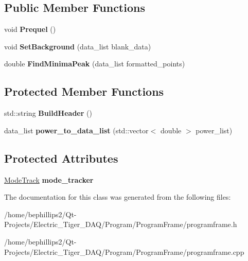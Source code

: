 \subsection*{Public Member Functions}
\begin{DoxyCompactItemize}
\item 
void {\bfseries Prequel} ()\hypertarget{class_program_frame_ad414371825d10a527fce320dfa54496d}{}\label{class_program_frame_ad414371825d10a527fce320dfa54496d}

\item 
void {\bfseries Set\+Background} (data\+\_\+list blank\+\_\+data)\hypertarget{class_program_frame_ad55dd180e9e02fed30d845acf7fab172}{}\label{class_program_frame_ad55dd180e9e02fed30d845acf7fab172}

\item 
double {\bfseries Find\+Minima\+Peak} (data\+\_\+list formatted\+\_\+points)\hypertarget{class_program_frame_afb7bcef124f7322ddbbdb92f019e2fce}{}\label{class_program_frame_afb7bcef124f7322ddbbdb92f019e2fce}

\end{DoxyCompactItemize}
\subsection*{Protected Member Functions}
\begin{DoxyCompactItemize}
\item 
std\+::string {\bfseries Build\+Header} ()\hypertarget{class_program_frame_adf569dd423bc777236db96cb781fd15b}{}\label{class_program_frame_adf569dd423bc777236db96cb781fd15b}

\item 
data\+\_\+list {\bfseries power\+\_\+to\+\_\+data\+\_\+list} (std\+::vector$<$ double $>$ power\+\_\+list)\hypertarget{class_program_frame_aee5a4d7ddc9308718d58d285fbce5acf}{}\label{class_program_frame_aee5a4d7ddc9308718d58d285fbce5acf}

\end{DoxyCompactItemize}
\subsection*{Protected Attributes}
\begin{DoxyCompactItemize}
\item 
\hyperlink{class_mode_track}{Mode\+Track} {\bfseries mode\+\_\+tracker}\hypertarget{class_program_frame_a20dca16ac55a07c4c1e1f47cae386740}{}\label{class_program_frame_a20dca16ac55a07c4c1e1f47cae386740}

\end{DoxyCompactItemize}


The documentation for this class was generated from the following files\+:\begin{DoxyCompactItemize}
\item 
/home/bephillips2/\+Qt-\/\+Projects/\+Electric\+\_\+\+Tiger\+\_\+\+D\+A\+Q/\+Program/\+Program\+Frame/programframe.\+h\item 
/home/bephillips2/\+Qt-\/\+Projects/\+Electric\+\_\+\+Tiger\+\_\+\+D\+A\+Q/\+Program/\+Program\+Frame/programframe.\+cpp\end{DoxyCompactItemize}
